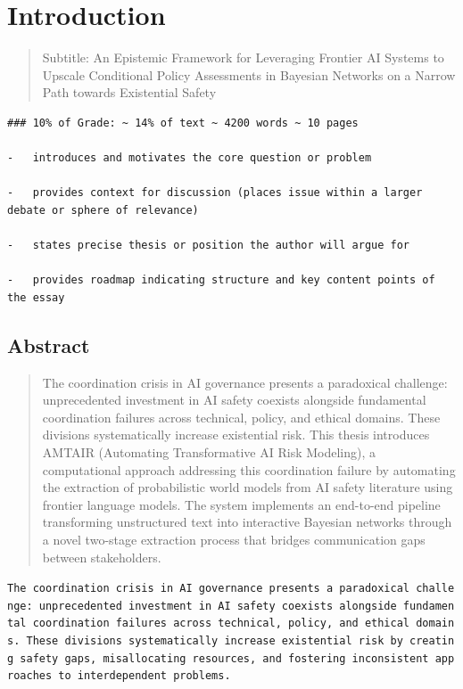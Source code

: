 \documentclass[
  11pt,
  letterpaper,
]{book}
\begin{document}

\chapter{Introduction}\label{introduction}

\begin{quote}
Subtitle: An Epistemic Framework for Leveraging Frontier AI Systems to
Upscale Conditional Policy Assessments in Bayesian Networks on a Narrow
Path towards Existential Safety
\end{quote}

\begin{verbatim}
### 10% of Grade: ~ 14% of text ~ 4200 words ~ 10 pages

-   introduces and motivates the core question or problem

-   provides context for discussion (places issue within a larger debate or sphere of relevance)

-   states precise thesis or position the author will argue for

-   provides roadmap indicating structure and key content points of the essay
\end{verbatim}

\section*{Abstract}\label{sec-abstract}


\begin{quote}
The coordination crisis in AI governance presents a paradoxical
challenge: unprecedented investment in AI safety coexists alongside
fundamental coordination failures across technical, policy, and ethical
domains. These divisions systematically increase existential risk. This
thesis introduces AMTAIR (Automating Transformative AI Risk Modeling), a
computational approach addressing this coordination failure by
automating the extraction of probabilistic world models from AI safety
literature using frontier language models. The system implements an
end-to-end pipeline transforming unstructured text into interactive
Bayesian networks through a novel two-stage extraction process that
bridges communication gaps between stakeholders.
\end{quote}

\texttt{The\ coordination\ crisis\ in\ AI\ governance\ presents\ a\ paradoxical\ challenge:\ unprecedented\ investment\ in\ AI\ safety\ coexists\ alongside\ fundamental\ coordination\ failures\ across\ technical,\ policy,\ and\ ethical\ domains.\ These\ divisions\ systematically\ increase\ existential\ risk\ by\ creating\ safety\ gaps,\ misallocating\ resources,\ and\ fostering\ inconsistent\ approaches\ to\ interdependent\ problems.}
\end{document}
